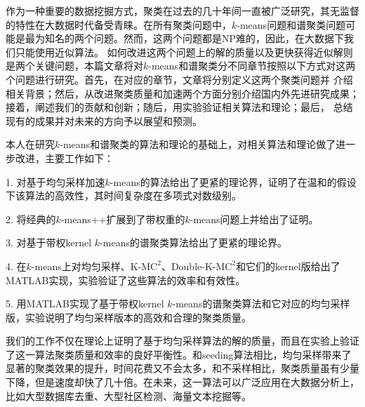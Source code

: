 	
\begin{chineseabstract}
作为一种重要的数据挖掘方式，聚类在过去的几十年间一直被广泛研究，其无监督的特性在大数据时代备受青睐。在所有聚类问题中，$k$-means问题和谱聚类问题可能是最为知名的两个问题。然而，这两个问题都是NP难的，因此，在大数据下我们只能使用近似算法。
如何改进这两个问题上的解的质量以及更快获得近似解则是两个关键问题，本篇文章将对$k$-means和谱聚类分不同章节按照以下方式对这两个问题进行研究。首先，在对应的章节，文章将分别定义这两个聚类问题并
介绍相关背景；然后，从改进聚类质量和加速两个方面分别介绍国内外先进研究成果；接着，阐述我们的贡献和创新；随后，用实验验证相关算法和理论；最后， 总结现有的成果并对未来的方向予以展望和预测。


本人在研究$k$-means和谱聚类的算法和理论的基础上，对相关算法和理论做了进一步改进，主要工作如下：

1. 对基于均匀采样加速$k$-means的算法给出了更紧的理论界，证明了在温和的假设下该算法的高效性，其时间复杂度在多项式对数级别。

2. 将经典的$k$-means++扩展到了带权重的$k$-means问题上并给出了证明。

3. 对基于带权kernel $k$-means的谱聚类算法给出了更紧的理论界。

4. 在$k$-means上对均匀采样、K-M$\text{C}^2$、Double-K-M$\text{C}^2$和它们的kernel版给出了MATLAB实现，实验验证了这些算法的效率和有效性。

5. 用MATLAB实现了基于带权kernel $k$-means的谱聚类算法和它对应的均匀采样版，实验说明了均匀采样版本的高效和合理的聚类质量。

我们的工作不仅在理论上证明了基于均匀采样算法的解的质量，而且在实验上验证了这一算法聚类质量和效率的良好平衡性。和seeding算法相比，均匀采样带来了显著的聚类效果的提升，时间花费又不会太多，和不采样相比，聚类质量虽有少量下降，但是速度却快了几十倍。在未来，这一算法可以广泛应用在大数据分析上，比如大型数据库去重、大型社区检测、海量文本挖掘等。

\end{chineseabstract}

